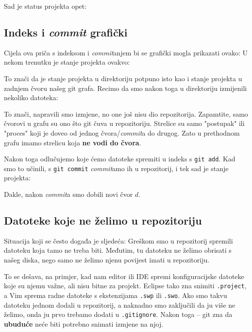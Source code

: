 Sad je status projekta opet:



\subsection*{Indeks i \emph{commit} grafički}

Cijela ova priča s indeksom i \emph{commit}anjem bi se grafički mogla prikazati ovako:
U nekom trenutku je stanje projekta ovakvo:



To znači da je stanje projekta u direktoriju potpuno isto kao i stanje projekta u zadnjem čvoru našeg git grafa.
Recimo da smo nakon toga u direktoriju izmijenili nekoliko datoteka:



To znači, napravili smo izmjene, no one još nisu dio repozitorija.
Zapamtite, samo čvorovi u grafu su ono što git čuva u repozitoriju.
Strelice su samo "postupak" ili "proces" koji je doveo od jednog čvora/\emph{commit}a do drugog.
Zato u prethodnom grafu imamo strelicu koja \textbf{ne vodi do čvora}.

Nakon toga odlučujemo koje ćemo datoteke spremiti u indeks s \verb+git add+.
Kad smo to učinili, s \verb+git commit+ \emph{commit}amo ih u repozitorij, i tek sad je stanje projekta:



Dakle, nakon \emph{commit}a smo dobili novi čvor $d$.

\subsection*{Datoteke koje ne želimo u repozitoriju}

Situacija koji se često događa je sljedeća:
Greškom smo u repozitorij spremili datoteku koja tamo ne treba biti. 
Međutim, tu datoteku ne želimo obrisati s našeg diska, nego samo ne želimo njenu povijest imati u repozitoriju.

To se dešava, na primjer, kad nam editor ili IDE spremi konfiguracijske datoteke koje su njemu važne, ali nisu bitne za projekt.
Eclipse tako zna snimiti \verb+.project+, a Vim sprema radne datoteke s ekstenzijama \verb+.swp+ ili \verb+.swo+.
Ako smo takvu datoteku jednom dodali u repozitorij, a naknadno smo zaključili da ju više ne želimo, onda ju prvo trebamo dodati u \verb+.gitignore+.
Nakon toga -- git zna da \textbf{ubuduće} neće biti potrebno snimati izmjene na njoj.

